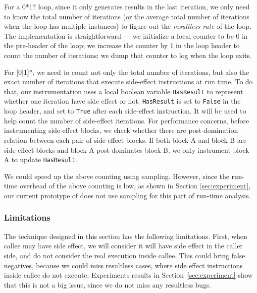 For a 0*1? loop, since it only generates results in the last iteration, we 
only need to know the total number of iterations (or the average total number 
of iterations when the loop has multiple instances) to figure out the 
\textit{resultless rate} of the loop. The implementation is straightforward
--- we initialize a local counter to be 0 in the pre-header of the loop; we 
increase the counter by 1 in the loop header to count the number of 
iterations; we dump that counter to log when the loop exits.

For [0$|$1]*, we need to count not only the total number of iterations, but
also the exact number of iterations that execute side-effect instructions
at run time. 
To do that, our instrumentation uses a local boolean variable 
\texttt{HasResult} to represent whether one iteration have side effect or not. 
\texttt{HasResult} is set to \texttt{False} in the loop header, and set to
\texttt{True} after each side-effect instruction. It will be used to help
count the number of side-effect iterations. For performance concerns,
before instrumenting side-effect blocks, we check whether there are 
post-domination relation between each pair of side-effect blocks. 
If both block A and block B are side-effect blocks and block A post-dominates 
block B, we only instrument block A to update \texttt{HasResult}. 

We could speed up the above counting using sampling. However, since the 
run-time overhead of the above counting is low, as shown in Section 
\ref{sec:experiment}, our current prototype of \Tool does 
not use sampling for this part of run-time analysis.


\subsubsection{Limitations}
\label{sec:l_workless}
The technique designed in this section has the following limitations.
First, when callee may have side effect, we will consider it will have side effect in the caller side, 
and do not consider the real execution inside callee. This could bring false negatives, 
because we could miss resultless cases, 
where side effect instructions inside callee do not execute. 
Experiments results in Section~\ref{sec:experiment} show that this is not a big issue, 
since we do not miss any resultless bugs.  


